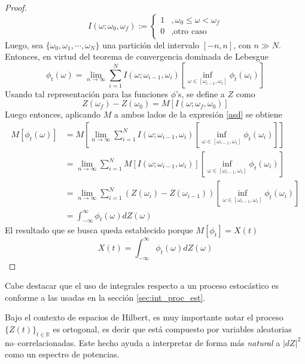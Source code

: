 \documentclass[12pt,letterpaper]{book}
\newcommand{\R}{\mathbb{R}}
\newcommand{\intR}{\int_{-\infty}^{\infty}}
\newcommand{\abso}[1]{\left| #1 \right|}
\begin{document}
\begin{proof}
\begin{equation}
I(\omega; \omega_0, \omega_f) := \begin{cases}
1 &, \omega_0 \leq \omega < \omega_f \\
0 &, \text{otro caso}
\end{cases}
\end{equation}
Luego, sea $\{\omega_0, \omega_1, \cdots, \omega_N\}$ una partición del intervalo $[-n,n]$, con $n\gg N$. Entonces, en virtud del teorema de convergencia dominada de Lebesgue
\begin{equation}
\phi_t(\omega) = \lim_{n\rightarrow\infty} \sum_{i=1}^{N} I(\omega; \omega_{i-1}, \omega_i) \left[  \inf_{\omega \in [\omega_{i-1},\omega_i]} \phi_t(\omega_{i})\right]
\label{asd}
\end{equation}
Usando tal representación para las funciones $\phi$'s, se define a $Z$ como
\begin{equation}
Z(\omega_f) - Z(\omega_0) = M\left[ I(\omega; \omega_f, \omega_0) \right]
\end{equation}
Luego entonces, aplicando $M$ a ambos lados de la expresión \ref{asd} se obtiene
\begin{align*}
M\left[ \phi_t(\omega) \right] &= M\left[ \lim_{n\rightarrow\infty} \sum_{i=1}^{N} I(\omega; \omega_{i-1}, \omega_i) \left[  \inf_{\omega \in [\omega_{i-1},\omega_i]} \phi_t(\omega_{i})\right] \right] \\
&= \lim_{n\rightarrow\infty} \sum_{i=1}^{N} M\left[I(\omega; \omega_{i-1}, \omega_i) \right] \left[  \inf_{\omega \in [\omega_{i-1},\omega_i]} \phi_t(\omega_{i})\right] \\
&= \lim_{n\rightarrow\infty} \sum_{i=1}^{N} \left( Z(\omega_i) - Z(\omega_{i-1})\right) \left[  \inf_{\omega \in [\omega_{i-1},\omega_i]} \phi_t(\omega_{i})\right] \\
&= \intR \phi_t(\omega) dZ(\omega)
\end{align*}
El resultado que se busca queda establecido porque $M[\phi_t] = X(t)$
\begin{equation}
X(t) = \intR \phi_t(\omega) dZ(\omega)
\end{equation}
\end{proof}

Cabe destacar que el uso de integrales respecto a un proceso estocástico es conforme a las usadas en la sección \ref{sec:int_proc_est}.

Bajo el contexto de espacios de Hilbert, es muy importante notar el proceso $\{Z(t)\}_{t\in \R}$ es ortogonal, es decir que está compuesto por variables aleatorias no--correlacionadas.
%
Este hecho ayuda a interpretar de forma más \textit{natural} a $\abso{dZ}^2$ como un espectro de potencias.
\end{document}
